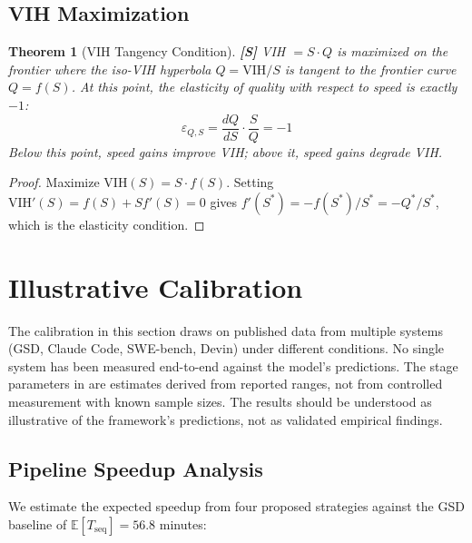 \documentclass[11pt, a4paper, logo, copyright]{googledeepmind}
\newtheorem{theorem}{Theorem}[section]
\newcommand{\VIH}{\mathrm{VIH}}
\newcommand{\E}{\mathbb{E}}
\begin{document}
\subsection{VIH Maximization}

\begin{theorem}[VIH Tangency Condition]\label{thm:tangency}
\textbf{[S]} VIH $= S \cdot Q$ is maximized on the frontier where the iso-VIH hyperbola $Q = \VIH/S$ is tangent to the frontier curve $Q = f(S)$. At this point, the elasticity of quality with respect to speed is exactly $-1$:
\[
    \varepsilon_{Q,S} = \frac{dQ}{dS} \cdot \frac{S}{Q} = -1
\]
Below this point, speed gains improve VIH; above it, speed gains degrade VIH.
\end{theorem}

\begin{proof}
Maximize $\VIH(S) = S \cdot f(S)$. Setting $\VIH'(S) = f(S) + S f'(S) = 0$ gives $f'(S^*) = -f(S^*)/S^* = -Q^*/S^*$, which is the elasticity condition.
\end{proof}


\section{Illustrative Calibration}\label{sec:calibration}

The calibration in this section draws on published data from multiple systems (GSD, Claude Code, SWE-bench, Devin) under different conditions. No single system has been measured end-to-end against the model's predictions. The stage parameters in  are estimates derived from reported ranges, not from controlled measurement with known sample sizes. The results should be understood as illustrative of the framework's predictions, not as validated empirical findings.

\subsection{Pipeline Speedup Analysis}

We estimate the expected speedup from four proposed strategies against the GSD baseline of $\E[T_{\mathrm{seq}}] = 56.8$ minutes:
\end{document}

